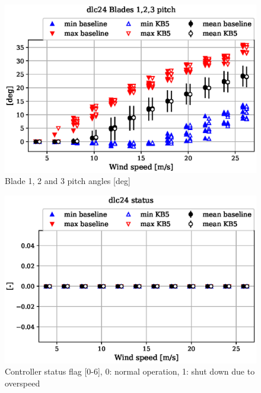 \begin{figure}[!ht]
\begin{center}
	\includegraphics[width=.85\linewidth]{figures/baseline-vs-KB6/dlc24/bearing-pitch1-angle-deg_AA0008_AA0008.eps}
\end{center}
\caption{Blade 1, 2 and 3 pitch angles [deg]}
\label{fig:baseline-vs-KB6:dlc24:pitch}
\end{figure}

\begin{figure}[!ht]
\begin{center}
	\includegraphics[width=.85\linewidth]{figures/baseline-vs-KB6/dlc24/DLL-dtu_we_controller-inpvec-22_AA0008_AA0008.eps}
\end{center}
\caption{Controller status flag [0-6], 0: normal operation, 1: shut down due to overspeed}
\label{fig:baseline-vs-KB6:dlc24:status}
\end{figure}

